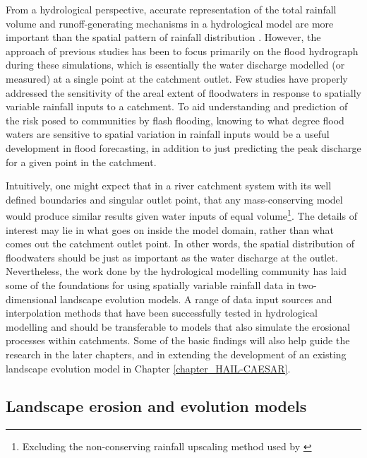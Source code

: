 From a hydrological perspective, accurate representation of the total rainfall volume and runoff-generating mechanisms in a hydrological model are more important than the spatial pattern of rainfall distribution \citep{gabellani2007propagation,nicotina2008impact}. However, the approach of previous studies has been to focus primarily on the flood hydrograph during these simulations, which is essentially the water discharge modelled (or measured) at a single point at the catchment outlet. Few studies have properly addressed the sensitivity of the areal extent of floodwaters in response to spatially variable rainfall inputs to a catchment. To aid understanding and prediction of the risk posed to communities by flash flooding, knowing to what degree flood waters are sensitive to spatial variation in rainfall inputs would be a useful development in flood forecasting, in addition to just predicting the peak discharge for a given point in the catchment.

Intuitively, one might expect that in a river catchment system with its well defined boundaries and singular outlet point, that any mass-conserving model would produce similar results given water inputs of equal volume\footnote{Excluding the non-conserving rainfall upscaling method used by \citet{nicotina2008impact}}. The details of interest may lie in what goes on inside the model domain, rather than what comes out the catchment outlet point. In other words, the spatial distribution of floodwaters should be just as important as the water discharge at the outlet. Nevertheless, the work done by the hydrological modelling community has laid some of the foundations for using spatially variable rainfall data in two-dimensional landscape evolution models. A range of data input sources and interpolation methods that have been successfully tested in hydrological modelling and should be transferable to models that also simulate the erosional processes within catchments. Some of the basic findings will also help guide the research in the later chapters, and in extending the development of an existing landscape evolution model in Chapter \ref{chapter_HAIL-CAESAR}.

\subsection{Landscape erosion and evolution models}


